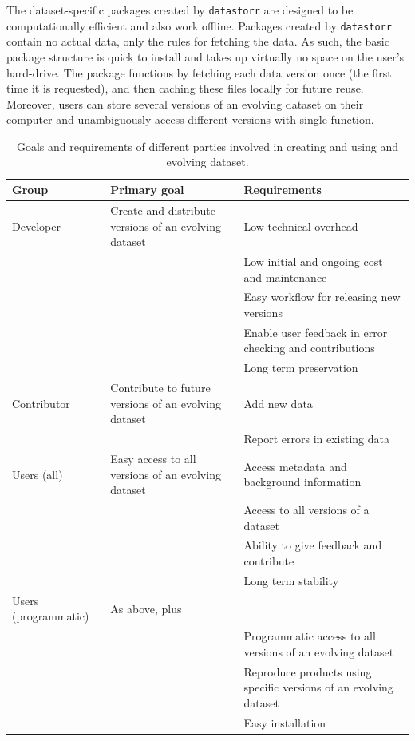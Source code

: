\documentclass[a4paper,num-refs]{assets/oup-contemporary}
\begin{document}
The dataset-specific packages created by \texttt{datastorr} are designed to be computationally efficient and also work offline. Packages created by \texttt{datastorr} contain no actual data, only the rules for fetching the data. As such, the basic package structure is quick to install and takes up virtually no space on the user's hard-drive. The package functions by fetching each data version once (the first time it is requested), and then caching these files locally for future reuse. Moreover, users can store several versions of an evolving dataset on their computer and unambiguously access different versions with single function.

\begin{table}[t!]
\centering
\caption{Goals and requirements of different parties involved in creating and using and evolving dataset.}
\vspace{0.2cm}
  \begin{tabular}{p{3cm}p{5cm}p{8cm}}
  \hline
  \textbf{Group} & \textbf{Primary goal} & \textbf{Requirements} \\ \hline
  Developer & Create and distribute versions of an evolving dataset & Low technical overhead \\
    & & Low initial and ongoing cost and maintenance \\
    & & Easy workflow for releasing new versions \\
    & & Enable user feedback in error checking and contributions \\
    & & Long term preservation \\
  Contributor & Contribute to future versions of an evolving dataset & Add new data \\
    & & Report errors in existing data \\
  Users (all) & Easy access to all versions of an evolving dataset & Access metadata and background information\\
    & & Access to all versions of a dataset\\
    & & Ability to give feedback and contribute \\
    & & Long term stability \\
  Users (programmatic) &  As above, plus\\
    & & Programmatic access to all versions of an evolving dataset \\
    & & Reproduce products using specific versions of an evolving dataset \\
    & & Easy installation \\
  \hline
  \end{tabular}
\label{tab:user_requirements}
\end{table}
\end{document}
